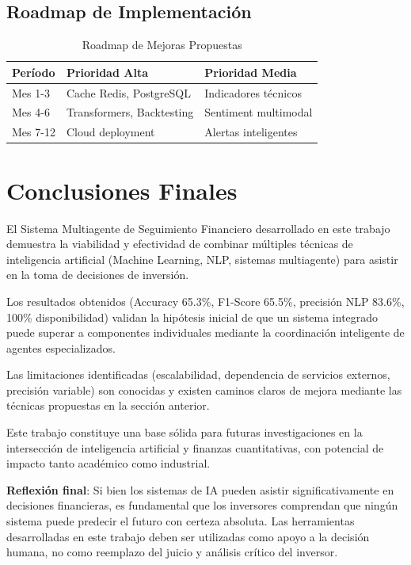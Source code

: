 \subsection{Roadmap de Implementación}

\begin{table}[htbp]
\centering
\caption{Roadmap de Mejoras Propuestas}
\label{tab:roadmap}
\begin{tabular}{lll}
\hline
\textbf{Período} & \textbf{Prioridad Alta} & \textbf{Prioridad Media} \\
\hline
Mes 1-3 & Cache Redis, PostgreSQL & Indicadores técnicos \\
Mes 4-6 & Transformers, Backtesting & Sentiment multimodal \\
Mes 7-12 & Cloud deployment & Alertas inteligentes \\
\hline
\end{tabular}
\end{table}

\section{Conclusiones Finales}

El Sistema Multiagente de Seguimiento Financiero desarrollado en este trabajo demuestra la viabilidad y efectividad de combinar múltiples técnicas de inteligencia artificial (Machine Learning, NLP, sistemas multiagente) para asistir en la toma de decisiones de inversión.

Los resultados obtenidos (Accuracy 65.3\%, F1-Score 65.5\%, precisión NLP 83.6\%, 100\% disponibilidad) validan la hipótesis inicial de que un sistema integrado puede superar a componentes individuales mediante la coordinación inteligente de agentes especializados.

Las limitaciones identificadas (escalabilidad, dependencia de servicios externos, precisión variable) son conocidas y existen caminos claros de mejora mediante las técnicas propuestas en la sección anterior.

Este trabajo constituye una base sólida para futuras investigaciones en la intersección de inteligencia artificial y finanzas cuantitativas, con potencial de impacto tanto académico como industrial.

\textbf{Reflexión final}: Si bien los sistemas de IA pueden asistir significativamente en decisiones financieras, es fundamental que los inversores comprendan que ningún sistema puede predecir el futuro con certeza absoluta. Las herramientas desarrolladas en este trabajo deben ser utilizadas como apoyo a la decisión humana, no como reemplazo del juicio y análisis crítico del inversor.

